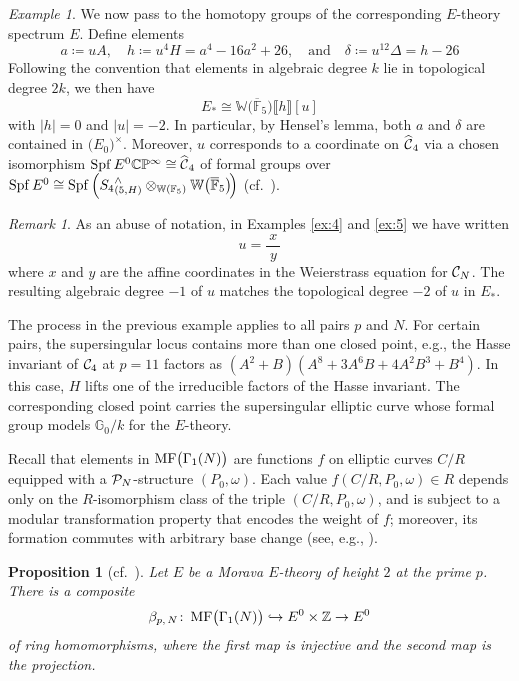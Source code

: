 \documentclass{gtpart}
\newtheorem{prop}[thm]{Proposition}
\theoremstyle{definition}
\theoremstyle{remark}
\newtheorem{rmk}[thm]{Remark}
\newtheorem{ex}[thm]{Example}
\def\co{\colon\thinspace}
\newcommand{\mb}[1]{\mathbb{#1}}
\newcommand{\Spf}{{\rm Spf\thinspace}}
\newcommand{\cF}{\overline {\mb F}}
\newcommand{\CC}{{\cal C}}
\newcommand{\CP}{{\cal P}}
\newcommand{\BC}{{\mb C}}
\newcommand{\BF}{{\mb F}}
\newcommand{\BG}{{\mb G}}
\newcommand{\BP}{{\mb P}}
\newcommand{\BW}{{\mb W}}
\newcommand{\BZ}{{\mb Z}}
\newcommand{\HCC}{\widehat{~\!\!\CC}}
\newcommand{\ad}{\text{and}}
\newcommand{\MF}{{\rm MF}}
\newcommand{\B}{\beta}
\renewcommand{\D}{\Delta}
\renewcommand{\d}{\delta}
\newcommand{\G}{\Gamma}
\newcommand{\ce}{\coloneqq}
\newcommand{\lb}{\llbracket}
\newcommand{\rb}{\rrbracket}
\renewcommand{\=}{\approx}
\renewcommand{\-}{\sim}
\numberwithin{equation}{section}
\numberwithin{thm}{section}
\begin{document}
\begin{ex}
 We now pass to the homotopy groups of the corresponding $E$-theory spectrum 
 $E$.  Define elements 
 \[
  a \ce u A, \quad h \ce u^4 H = a^4 - 16 a^2 + 26, \quad \ad \quad \d \ce 
  u^{12} \D = h - 26 
 \]
 Following the convention that elements in algebraic degree $k$ lie in 
 topological degree $2 k$, we then have 
 \[
  E_* \cong \BW \big( \cF_5 \big) \lb h \rb [u] 
 \]
 with $|h| = 0$ and $|u| = -2$.  In particular, by Hensel's lemma, both $a$ and 
 $\d$ are contained in $\big( E_0 \big)^{\!\times}$.  Moreover, $u$ corresponds 
 to a coordinate on $\HCC_4$ via a chosen isomorphism 
 $\Spf E^0 \BC\BP^\infty \cong \HCC_4$ of formal groups over $\Spf E^0 \cong 
 \Spf\!\left( {S_4}^\wedge_{(5,H)} \otimes_{\BW(\BF_5)} 
 \BW \big( \cF_5 \big) \!\right)$ (cf.~\cite[Definition 1.2]{AHS01}).  
\end{ex}

\begin{rmk}
 \label{rmk:abuse}
 As an abuse of notation, in Examples \ref{ex:4} and \ref{ex:5} we have written 
 \[
  u = \frac{~\!x~\!}{y} 
 \]
 where $x$ and $y$ are the affine coordinates in the Weierstrass equation for 
 $\CC_N$.  The resulting algebraic degree $-1$ of $u$ matches the topological 
 degree $-2$ of $u$ in $E_*$.  
\end{rmk}

The process in the previous example applies to all pairs $p$ and $N$.  For 
certain pairs, the supersingular locus contains more than one closed point, 
e.g., the Hasse invariant of $\CC_4$ at $p = 11$ factors as 
$(A^2 + B) (A^8 + 3 A^6 B + 4 A^2 B^3 + B^4)$.  In this case, $H$ lifts one of 
the irreducible factors of the Hasse invariant.  The corresponding closed point 
carries the supersingular elliptic curve whose formal group models $\BG_0 / k$ 
for the $E$-theory.  

Recall that elements in $\MF\big(\G_1(N)\big)$ are functions $f$ on elliptic 
curves $C/R$ equipped with a $\CP_N$-structure $(P_0,\omega)$.  Each value 
$f(C/R, P_0, \omega) \in R$ depends only on the $R$-isomorphism class of the 
triple $(C/R, P_0, \omega)$, and is subject to a modular transformation property 
that encodes the weight of $f$; moreover, its formation commutes with arbitrary 
base change (see, e.g., \cite[Section 1.2]{padicprop}).  

\begin{prop}[cf.~{\cite[Lemma 6.3]{BOSS}}]
 \label{prop:mfe0}
 Let $E$ be a Morava $E$-theory of height $2$ at the prime $p$.  There is a 
 composite 
 \[
  \B_{p,\,N} \co \MF\big(\G_1(N)\big) \hookrightarrow E^0 \times \BZ \to E^0 
 \]
 of ring homomorphisms, where the first map is injective and the second map is 
 the projection.  
\end{prop}
\end{document}
